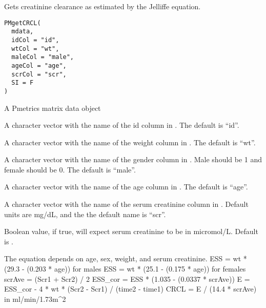 \documentclass[a4paper]{book}
\begin{document}
%
\begin{Description}\relax
Gets creatinine clearance as estimated by the Jelliffe equation.
\end{Description}
%
\begin{Usage}
\begin{verbatim}
PMgetCRCL(
  mdata,
  idCol = "id",
  wtCol = "wt",
  maleCol = "male",
  ageCol = "age",
  scrCol = "scr",
  SI = F
)
\end{verbatim}
\end{Usage}
%
\begin{Arguments}
\begin{ldescription}
\item[\code{mdata}] A Pmetrics matrix data object

\item[\code{idCol}] A character vector with the name
of the id column in . The default is ``id''.

\item[\code{wtCol}] A character vector with the name of the weight
column in .  The default is ``wt''.

\item[\code{maleCol}] A character vector with the name of the gender column in .
Male should be 1 and female should be 0. The default is ``male''.

\item[\code{ageCol}] A character vector with the name of the age column in .
The default is ``age''.

\item[\code{scrCol}] A character vector with the name of the serum creatinine column in .
Default units are mg/dL, and the the default name is ``scr''.

\item[\code{SI}] Boolean value, if true, will expect serum creatinine to be in micromol/L.
Default is .
\end{ldescription}
\end{Arguments}
%
\begin{Details}\relax
The equation depends on age, sex, weight, and serum creatinine.
ESS = wt * (29.3 - (0.203 * age)) for males
ESS = wt * (25.1 - (0.175 * age)) for females
scrAve = (Scr1 + Scr2) / 2
ESS\_cor = ESS * (1.035 - (0.0337 * scrAve))
E = ESS\_cor - 4 * wt * (Scr2 - Scr1) / (time2 - time1)
CRCL = E / (14.4 * scrAve) in ml/min/1.73m\textasciicircum{}2
\end{Details}
\end{document}
